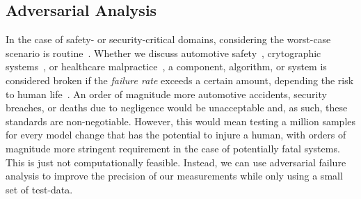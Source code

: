 \documentclass[conference]{IEEEtran}
\begin{document}
\subsection{Adversarial Analysis}

In the case of safety- or security-critical domains, considering the worst-case scenario is routine~\cite{sajid2013cloud}. Whether we discuss automotive safety~\cite{ai_automotive}, crytographic systems~\cite{leurent2020sha,kamal2017study}, or healthcare malpractice~\cite{ai_medical_imaging}, a component, algorithm, or system is considered broken if the \textit{failure rate} exceeds a certain amount, depending the risk to human life~\cite{iso26262}. An order of magnitude more automotive accidents, security breaches, or deaths due to negligence would be unacceptable and, as such, these standards are non-negotiable. However, this would mean testing a million samples for every model change that has the potential to injure a human, with orders of magnitude more stringent requirement in the case of potentially fatal systems. This is just not computationally feasible. Instead, we can use adversarial failure analysis to improve the precision of our measurements while only using a small set of test-data.
\end{document}
